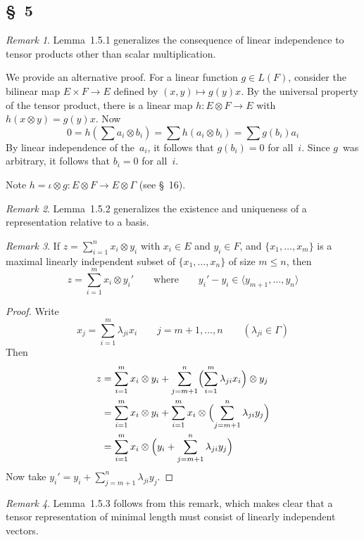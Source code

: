 \documentclass[letterpaper,12pt]{article}
\newcommand{\tprod}{\otimes}
\newcommand{\gen}[1]{\langle#1\rangle}
\theoremstyle{definition}
\theoremstyle{remark}
\newtheorem*{rmk}{Remark}
\begin{document}
\subsection*{\S~5}
\begin{rmk}
Lemma~1.5.1 generalizes the consequence of linear independence to tensor products other than scalar multiplication.

We provide an alternative proof. For a linear function \(g\in L(F)\), consider the bilinear map \(E\times F\to E\) defined by \((x,y)\mapsto g(y)x\). By the universal property of the tensor product, there is a linear map \(h:E\tprod F\to E\) with \(h(x\tprod y)=g(y)x\). Now
\[0=h(\sum a_i\tprod b_i)=\sum h(a_i\tprod b_i)=\sum g(b_i)a_i\]
By linear independence of the~\(a_i\), it follows that \(g(b_i)=0\) for all~\(i\). Since \(g\)~was arbitrary, it follows that \(b_i=0\) for all~\(i\).

Note \(h=\iota\tprod g:E\tprod F\to E\tprod\Gamma\) (see \S~16).
\end{rmk}

\begin{rmk}
Lemma~1.5.2 generalizes the existence and uniqueness of a representation relative to a basis.
\end{rmk}

\begin{rmk}
If \(z=\sum_{i=1}^n x_i\tprod y_i\) with \(x_i\in E\) and \(y_i\in F\), and \(\{x_1,\ldots,x_m\}\) is a maximal linearly independent subset of \(\{x_1,\ldots,x_n\}\) of size \(m\le n\), then
\[z=\sum_{i=1}^m x_i\tprod y_i'\qquad\text{where}\qquad y_i'-y_i\in\gen{y_{m+1},\ldots,y_n}\]
\end{rmk}
\begin{proof}
Write
\[x_j=\sum_{i=1}^m\lambda_{ji}x_i\qquad j=m+1,\ldots,n\qquad(\lambda_{ji}\in\Gamma)\]
Then
\begin{align*}
z&=\sum_{i=1}^m x_i\tprod y_i+\sum_{j=m+1}^n\Bigl(\sum_{i=1}^m\lambda_{ji}x_i\Bigr)\tprod y_j\\
	&=\sum_{i=1}^m x_i\tprod y_i+\sum_{i=1}^m x_i\tprod\Bigl(\sum_{j=m+1}^n\lambda_{ji} y_j\Bigr)\\
	&=\sum_{i=1}^m x_i\tprod\Bigl(y_i+\sum_{j=m+1}^n\lambda_{ji} y_j\Bigr)
\end{align*}
Now take \(y_i'=y_i+\sum_{j=m+1}^n\lambda_{ji} y_j\).
\end{proof}
\begin{rmk}
Lemma~1.5.3 follows from this remark, which makes clear that a tensor representation of minimal length must consist of linearly independent vectors.
\end{rmk}
\end{document}
